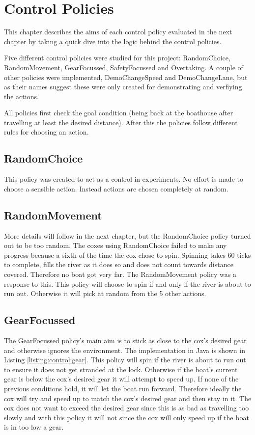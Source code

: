 \chapter{Control Policies}\label{chapter:control_policy}

This chapter describes the aims of each control policy evaluated in the next chapter by taking a quick dive into the logic behind the control policies.

Five different control policies were studied for this project: RandomChoice, RandomMovement, GearFocussed, SafetyFocussed and Overtaking. A couple of other policies were implemented, DemoChangeSpeed and DemoChangeLane, but as their names suggest these were only created for demonstrating and verfiying the actions.

All policies first check the goal condition (being back at the boathouse after travelling at least the desired distance). After this the policies follow different rules for choosing an action.

\section{RandomChoice}
This policy was created to act as a control in experiments. No effort is made to choose a sensible action. Instead actions are chosen completely at random.

\section{RandomMovement}

More details will follow in the next chapter, but the RandomChoice policy turned out to be too random. The coxes using RandomChoice failed to make any progress because a sixth of the time the cox chose to spin. Spinning takes 60 ticks to complete, fills the river as it does so and does not count towards distance covered. Therefore no boat got very far. The RandomMovement policy was a response to this. This policy will choose to spin if and only if the river is about to run out. Otherwise it will pick at random from the 5 other actions.

\section{GearFocussed}

The GearFocussed policy's main aim is to stick as close to the cox's desired gear and otherwise ignores the environment. The implementation in Java is shown in Listing \ref{listing:control:gear}. This policy will spin if the river is about to run out to ensure it does not get stranded at the lock. Otherwise if the boat's current gear is below the cox's desired gear it will attempt to speed up. If none of the previous conditions hold, it will let the boat run forward. Therefore ideally the cox will try and speed up to match the cox's desired gear and then stay in it. The cox does not want to exceed the desired gear since this is as bad as travelling too slowly and with this policy it will not since the cox will only speed up if the boat is in too low a gear.

